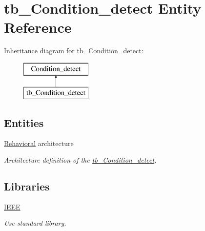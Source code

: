 \hypertarget{classtb___condition__detect}{}\section{tb\+\_\+\+Condition\+\_\+detect Entity Reference}
\label{classtb___condition__detect}
Inheritance diagram for tb\+\_\+\+Condition\+\_\+detect\+:\begin{figure}[H]
\begin{center}
\leavevmode
\includegraphics[height=2.000000cm]{classtb___condition__detect}
\end{center}
\end{figure}
\subsection*{Entities}
\begin{DoxyCompactItemize}
\item 
\hyperlink{classtb___condition__detect_1_1_behavioral}{Behavioral} architecture
\begin{DoxyCompactList}\small\item\em Architecture definition of the \hyperlink{classtb___condition__detect}{tb\+\_\+\+Condition\+\_\+detect}. \end{DoxyCompactList}\end{DoxyCompactItemize}
\subsection*{Libraries}
 \begin{DoxyCompactItemize}
\item 
\hyperlink{classtb___condition__detect_ae4f03c286607f3181e16b9aa12d0c6d4}{I\+E\+EE} \hypertarget{classtb___condition__detect_ae4f03c286607f3181e16b9aa12d0c6d4}{}\label{classtb___condition__detect_ae4f03c286607f3181e16b9aa12d0c6d4}

\begin{DoxyCompactList}\small\item\em Use standard library. \end{DoxyCompactList}\end{DoxyCompactItemize}
